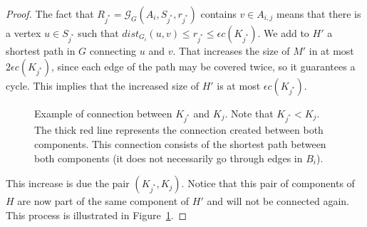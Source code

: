 \begin{proof}
The fact that \(R_{j^\ast} = \mathcal{G}_G(A_i, S_{j^\ast}, r_{j^\ast})\) contains \(v \in A_{i, j}\) means that there is a vertex \(u \in S_{j^\ast}\) such that \(dist_{G_i}(u, v) \leq r_{j^\ast} \leq \epsilon c(K_{j^\ast})\). We add to \(H'\) a shortest path in \(G\) connecting \(u\) and \(v\). That increases the size of \(M'\) in at most \(2 \epsilon c(K_{j^\ast})\), since each edge of the path may be covered twice, so it guarantees a cycle. This implies that the increased size of \(H'\) is at most \(\epsilon c(K_{j^\ast})\).


\begin{figure}[H]
    \centering
{}
    \caption{Example of connection between \(K_{j^\ast}\) and \(K_j\). Note that \(K_{j^\ast} < K_j\). The thick red line represents the connection created between both components. This connection consists of the shortest path between both components (it does not necessarily go through edges in \(B_i\)).}
    \label{fig:connect_k_j_ast_and_k_j}
\end{figure}


This increase is due the pair \((K_{j^\ast}, K_j)\). Notice that this pair of components of \(H\) are now part of the same component of \(H'\) and will not be connected again. This process is illustrated in Figure~\ref{fig:connect_k_j_ast_and_k_j}.


\end{proof}
